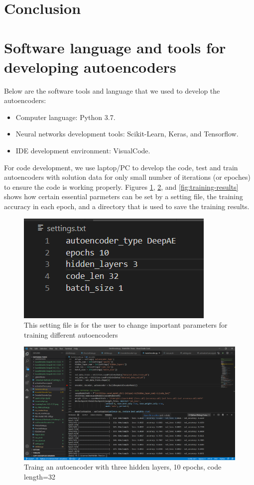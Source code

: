 \documentclass{article}
\begin{document}
\section{Conclusion} \label{Conclusion}

\appendix
\appendixpage
\section{Software language and tools for developing autoencoders}
Below are the software tools and language that we used to develop the autoencoders:
\begin{itemize}
	\item Computer language: Python 3.7.
	\item Neural networks development tools: Scikit-Learn, Keras, and Tensorflow.
	\item IDE development environment: VisualCode.
\end{itemize}
For code development, we use laptop/PC to develop the code, test and train autoencoders with solution data for only small number of iterations (or epoches) to ensure the code is working properly. Figures \ref{fig:settings}, \ref{fig:trainging}, and \ref{fig:training-results} shows how certain essential parmeters can be set by a setting file, the training accuracy in each epoch, and a directory that is used to save the training results.
\begin{figure}[h!]
	\includegraphics[width=.75\linewidth]{settings.png}
	\caption{This setting file is for the user to change important parameters for training different autoencoders}
	\label{fig:settings}
\end{figure}
\begin{figure}[h!]
	\includegraphics[width=1\linewidth]{training.png}
	\caption{Traing an autoencoder with three hidden layers, 10 epochs, code length=32}
	\label{fig:trainging}
\end{figure}
\end{document}
